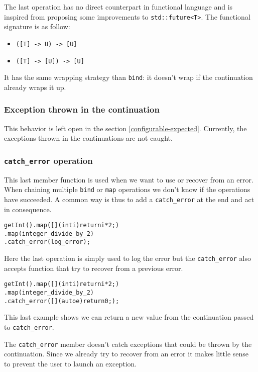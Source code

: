\documentclass[a4paper,10pt]{article}
\newcommand{\cpp}[1]{\lstinline{#1}}
\begin{document}
The last operation has no direct counterpart in functional language and is inspired from \cite{ImprovementsAsync} proposing some improvements to \cpp{std::future<T>}. The functional signature is as follow:

\begin{itemize}
\item \cpp{([T] -> U) -> [U]}
\item \cpp{([T] -> [U]) -> [U]}
\end{itemize}

It has the same wrapping strategy than \cpp{bind}: it doesn't wrap if the continuation already wraps it up.

\subsubsection{Exception thrown in the continuation}

This behavior is left open in the section \ref{configurable-expected}. Currently, the exceptions thrown in the continuations are not caught.

\subsubsection{\cpp{catch_error} operation}

This last member function is used when we want to use or recover from an error. When chaining multiple \cpp{bind} or \cpp{map} operations we don't know if the operations have succeeded. A common way is thus to add a \cpp{catch_error} at the end and act in consequence.

\begin{alltt}
getInt().map([](int i){return i * 2;})
        .map(integer_divide_by_2)
        .catch_error(log_error);
\end{alltt}

\noindent
Here the last operation is simply used to log the error but the \cpp{catch_error} also accepts function that try to recover from a previous error.

\begin{alltt}
getInt().map([](int i){return i * 2;})
        .map(integer_divide_by_2)
        .catch_error([](auto e) { return 0; });
\end{alltt}
\noindent
This last example shows we can return a new value from the continuation passed to \cpp{catch_error}.
\newline

The \cpp{catch_error} member doesn't catch exceptions that could be thrown by the continuation. Since we already try to recover from an error it makes little sense to prevent the user to launch an exception.
\end{document}
